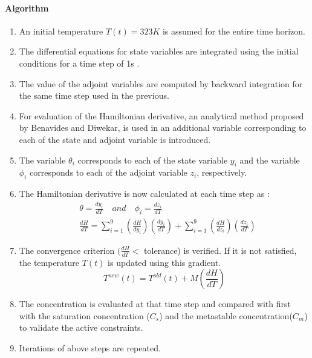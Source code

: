 \documentclass[3p,times]{elsarticle}
\begin{document}
\paragraph{Algorithm}
\begin{enumerate}
\item An initial temperature $T(t) = 323 K$ is assumed for the entire time horizon.
\item The differential equations for state variables are integrated using the initial conditions for a time step of 1s .
\item The value of the adjoint variables are computed by backward integration for the same time step used in the previous.
\item For evaluation of the Hamiltonian derivative, an analytical method proposed by Benavides and Diwekar\cite{benavides},  is used in an additional variable corresponding to each of the state and adjoint variable is introduced.
\item The variable $\theta_{i}$ corresponds to each of the state variable $y_{i}$ and the variable $\phi_{i}$ corresponds to each of the adjoint variable $z_{i}$, respectively.
\item The Hamiltonian derivative is now calculated at each time step  as :
\begin{align}
&\theta = \frac{dy_{i}}{dT} \quad and \quad \phi_{i} = \frac{dz_{i}}{dT} \\
&\frac{dH}{dT} = \sum_{i=1}^{9} \left( \frac{dH}{dy_{i}}\right)\left(	\frac{dy_{i}}{dT} \right) + \sum_{i=1}^{9} \left(\frac{dH}{dz_{i}}\right)\left(\frac{dz_{i}}{dT} \right)
\end{align}
\item The  convergence criterion $(\frac{dH}{dT}<$ tolerance) is verified. If it is not satisfied, the temperature $T(t)$ is updated using this gradient\cite{yenkie}.
\begin{equation}
T^{new}(t) = T^{old}(t) + M\left(\frac{dH}{dT} \right)
\end{equation}
\item The concentration is evaluated  at that time step and compared with first with the saturation concentration ($C_{s}$) and the metastable concentration($C_{m}$) to validate the active constraints.
\item Iterations of above steps are repeated.
\end{enumerate}

\end{document}
